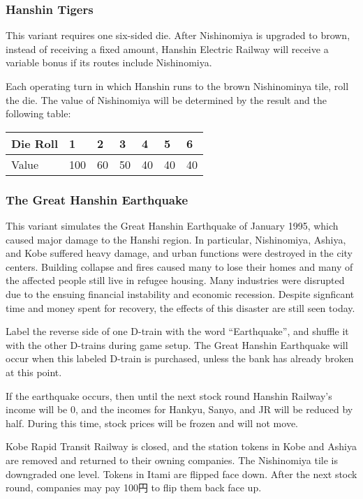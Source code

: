 \documentclass{article}
\begin{document}
\begin{CJK}{UTF8}{min}
\begin{multicols}{2}
\subsubsection{Hanshin Tigers}
This variant requires one six-sided die. After Nishinomiya is upgraded
to brown, instead of receiving a fixed amount, Hanshin Electric
Railway will receive a variable bonus if its routes include
Nishinomiya.

Each operating turn in which Hanshin runs to the brown Nishinominya
tile, roll the die. The value of Nishinomiya will be determined by the
result and the following table:

\begin{tabular}{l|llllll}
Die Roll & 1 & 2 & 3 & 4 & 5 & 6 \\
\hline
Value & 100 & 60 & 50 & 40 & 40 & 40 \\
\end{tabular}

\subsubsection{The Great Hanshin Earthquake}
This variant simulates the Great Hanshin Earthquake of January 1995,
which caused major damage to the Hanshi region. In particular,
Nishinomiya, Ashiya, and Kobe suffered heavy damage, and urban
functions were destroyed in the city centers. Building collapse and
fires caused many to lose their homes and many of the affected people
still live in refugee housing. Many industries were disrupted due to
the ensuing financial instability and economic recession. Despite
signficant time and money spent for recovery, the effects of this
disaster are still seen today.

Label the reverse side of one D-train with the word ``Earthquake'',
and shuffle it with the other D-trains during game setup. The Great
Hanshin Earthquake will occur when this labeled D-train is purchased,
unless the bank has already broken at this point.

If the earthquake occurs, then until the next stock round Hanshin
Railway's income will be 0, and the incomes for Hankyu, Sanyo, and JR
will be reduced by half. During this time, stock prices will be frozen
and will not move.

Kobe Rapid Transit Railway is closed, and the station tokens in Kobe
and Ashiya are removed and returned to their owning companies. The
Nishinomiya tile is downgraded one level. Tokens in Itami are flipped
face down. After the next stock round, companies may pay 100円 to flip
them back face up.


\end{multicols}
\end{CJK}
\end{document}

